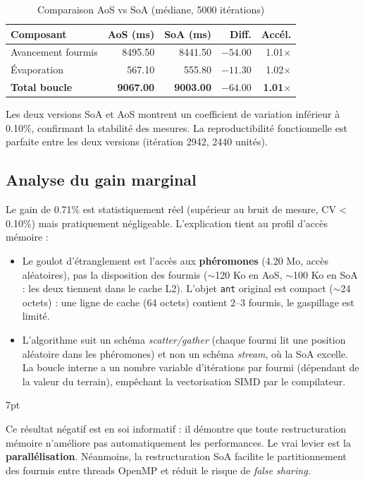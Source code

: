 \documentclass[11pt,a4paper]{article}
\newenvironment{formal}{%
  \def\FrameCommand{%
    \hspace{1pt}%
    {\color{enstaBleuFonce}\vrule width 2pt}%
    {\color{formalshade}\vrule width 4pt}%
    \colorbox{formalshade}%
  }%
  \MakeFramed{\advance\hsize-\width\FrameRestore}%
  \noindent\hspace{-4.55pt}%
  \begin{adjustwidth}{}{7pt}%
  \vspace{2pt}\vspace{2pt}%
}
{%
  \vspace{6pt}\end{adjustwidth}\endMakeFramed%
}
\begin{document}
\begin{table}[H]
\centering
\begin{tabular}{lrrrr}
\toprule
\textbf{Composant} & \textbf{AoS (ms)} & \textbf{SoA (ms)} & \textbf{Diff.} & \textbf{Accél.} \\
\midrule
Avancement fourmis       & 8495.50 & 8441.50 & $-54.00$ & 1.01$\times$ \\
Évaporation              & 567.10  & 555.80  & $-11.30$ & 1.02$\times$ \\
\textbf{Total boucle}    & \textbf{9067.00} & \textbf{9003.00} & \textbf{$-64.00$} & \textbf{1.01$\times$} \\
\bottomrule
\end{tabular}
\caption{Comparaison AoS vs SoA (médiane, 5000 itérations)}
\label{tab:soa}
\end{table}

Les deux versions SoA et AoS montrent un coefficient de variation inférieur à 0.10\%, confirmant la stabilité des mesures. La reproductibilité fonctionnelle est parfaite entre les deux versions (itération 2942, 2440 unités).

\subsection{Analyse du gain marginal}

Le gain de 0.71\% est statistiquement réel (supérieur au bruit de mesure, CV < 0.10\%) mais pratiquement négligeable. L'explication tient au profil d'accès mémoire :

\begin{itemize}[nosep]
    \item Le goulot d'étranglement est l'accès aux \textbf{phéromones} (4.20 Mo, accès aléatoires), pas la disposition des fourmis ($\sim$120 Ko en AoS, $\sim$100 Ko en SoA : les deux tiennent dans le cache L2). L'objet \texttt{ant} original est compact ($\sim$24 octets) : une ligne de cache (64 octets) contient 2--3 fourmis, le gaspillage est limité.
    \item L'algorithme suit un schéma \emph{scatter/gather} (chaque fourmi lit une position aléatoire dans les phéromones) et non un schéma \emph{stream}, où la SoA excelle. La boucle interne a un nombre variable d'itérations par fourmi (dépendant de la valeur du terrain), empêchant la vectorisation SIMD par le compilateur.
\end{itemize}

\begin{formal}
Ce résultat négatif est en soi informatif : il démontre que toute restructuration mémoire n'améliore pas automatiquement les performances. Le vrai levier est la \textbf{parallélisation}. Néanmoins, la restructuration SoA facilite le partitionnement des fourmis entre threads OpenMP et réduit le risque de \emph{false sharing}.
\end{formal}
\end{document}
